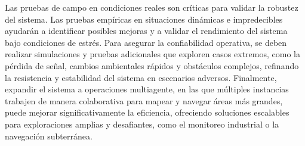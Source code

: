     \vskip 0.5cm
    Las pruebas de campo en condiciones reales son cr\'iticas para validar la robustez del sistema. Las pruebas 
        emp\'iricas en situaciones din\'amicas e impredecibles ayudar\'an a identificar posibles mejoras y a validar 
        el rendimiento del sistema bajo condiciones de estr\'es.
    \vskip 0.5cm
    Para asegurar la confiabilidad operativa, se deben realizar simulaciones y pruebas adicionales que exploren 
        casos extremos, como la p\'erdida de se\~nal, cambios ambientales r\'apidos y obst\'aculos complejos, refinando 
        la resistencia y estabilidad del sistema en escenarios adversos.
    \vskip 0.5cm
    Finalmente, expandir el sistema a operaciones multiagente, en las que m\'ultiples instancias trabajen de manera 
        colaborativa para mapear y navegar \'areas m\'as grandes, puede mejorar significativamente la eficiencia, ofreciendo 
        soluciones escalables para exploraciones amplias y desafiantes, como el monitoreo industrial o la navegaci\'on subterr\'anea.
    \vskip 0.5cm